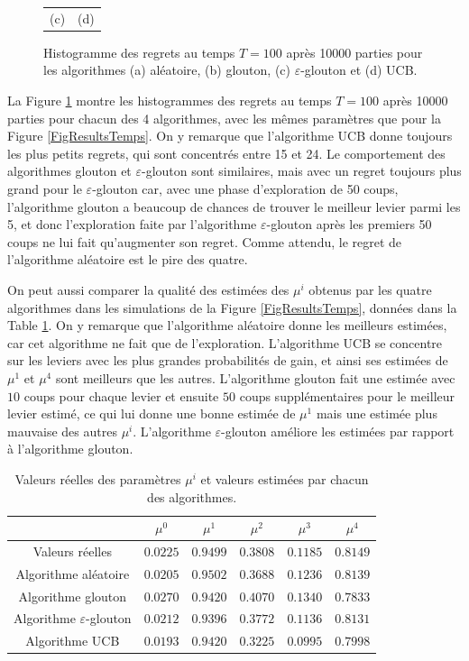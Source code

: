 \documentclass[a4paper,11pt]{article}
\begin{document}
\begin{figure}[ht]
\begin{tabular}{@{} >{\centering} m{} @{} >{\centering} m{} @{}}
(c) & (d) \tabularnewline
\end{tabular}
\caption{Histogramme des regrets au temps $T = 100$ après 10000 parties pour les algorithmes (a) aléatoire, (b) glouton, (c) $\varepsilon$-glouton et (d) UCB.}
\label{FigHist}
\end{figure}

La Figure \ref{FigHist} montre les histogrammes des regrets au temps $T = 100$ après 10000 parties pour chacun des 4 algorithmes, avec les mêmes paramètres que pour la Figure \ref{FigResultsTemps}. On y remarque que l'algorithme UCB donne toujours les plus petits regrets, qui sont concentrés entre 15 et 24. Le comportement des algorithmes glouton et $\varepsilon$-glouton sont similaires, mais avec un regret toujours plus grand pour le $\varepsilon$-glouton car, avec une phase d'exploration de 50 coups, l'algorithme glouton a beaucoup de chances de trouver le meilleur levier parmi les 5, et donc l'exploration faite par l'algorithme $\varepsilon$-glouton après les premiers 50 coups ne lui fait qu'augmenter son regret. Comme attendu, le regret de l'algorithme aléatoire est le pire des quatre.

On peut aussi comparer la qualité des estimées des $\mu^i$ obtenus par les quatre algorithmes dans les simulations de la Figure \ref{FigResultsTemps}, données dans la Table \ref{TabMu}. On y remarque que l'algorithme aléatoire donne les meilleurs estimées, car cet algorithme ne fait que de l'exploration. L'algorithme UCB se concentre sur les leviers avec les plus grandes probabilités de gain, et ainsi ses estimées de $\mu^1$ et $\mu^4$ sont meilleurs que les autres. L'algorithme glouton fait une estimée avec $10$ coups pour chaque levier et ensuite $50$ coups supplémentaires pour le meilleur levier estimé, ce qui lui donne une bonne estimée de $\mu^1$ mais une estimée plus mauvaise des autres $\mu^i$. L'algorithme $\varepsilon$-glouton améliore les estimées par rapport à l'algorithme glouton.

\begin{table}[ht]
\centering
\begin{tabular}{cccccc}
\hline\hline
 & $\mu^0$ & $\mu^1$ & $\mu^2$ & $\mu^3$ & $\mu^4$ \tabularnewline
\hline\hline
Valeurs réelles & $0.0225$ & $0.9499$ & $0.3808$ & $0.1185$ & $0.8149$ \tabularnewline
\hline
Algorithme aléatoire & $0.0205$ & $0.9502$ & $0.3688$ & $0.1236$ & $0.8139$ \tabularnewline
Algorithme glouton & $0.0270$ & $0.9420$ & $0.4070$ & $0.1340$ & $0.7833$\tabularnewline
Algorithme $\varepsilon$-glouton & $0.0212$ & $0.9396$ & $0.3772$ & $0.1136$ & $0.8131$\tabularnewline
Algorithme UCB & $0.0193$ & $0.9420$ & $0.3225$ & $0.0995$ & $0.7998$\tabularnewline
\hline\hline
\end{tabular}
\caption{Valeurs réelles des paramètres $\mu^i$ et valeurs estimées par chacun des algorithmes.}
\label{TabMu}
\end{table}
\end{document}
